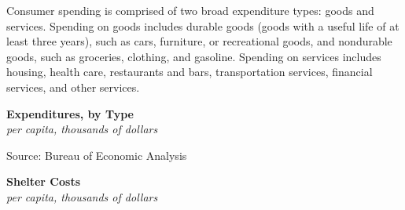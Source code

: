 \documentclass{report}
\makeatletter
\newcommand{\tbllink}[1]{\href{https://raw.githubusercontent.com/bdecon/US-chartbook/master/chartbook/data/#1}{\faTable}}
\newcommand*\short[1]{\expandafter\@gobbletwo\number\numexpr#1\relax}
\newcommand{\stdnode}[3]{\node[below, align=left, shift=({#1,#2})]{#3};}
\newcommand{\shdateaxisticks}{
		date coordinates in=x, axis line style={draw=none},
		xmax={2024-01-31},
		max space between ticks=40,	    
		xtick={{1990-01-01}, {1995-01-01}, {2000-01-01}, 
			{2005-01-01}, {2010-01-01}, {2015-01-01}, {2020-01-01}},
		minor xtick={},
		enlarge y limits={0.06}, enlarge x limits={0.01},
		xticklabel style={align=center, yshift=-2pt}, tick label style={inner sep=0pt},
		}
\newcommand{\bbar}[2]{extra #1 ticks = {{#2}}, extra #1 tick labels = ,
		extra #1 tick style = {grid=major, grid style={thick, black!25}},}
\newcommand{\stdline}[4]{\addplot[very thick, no markers, color=#1] 
		table [x=#2, y=#3, col sep=comma] {#4};	}
\newcommand{\rbars}{
		\fill[color=black!10] (axis cs:{1990-07-01},\pgfkeysvalueof{/pgfplots/ymin})
			rectangle (axis cs:{1991-03-01}, \pgfkeysvalueof{/pgfplots/ymax});
		\fill[color=black!10] (axis cs:{2007-12-01},\pgfkeysvalueof{/pgfplots/ymin})
			rectangle (axis cs:{2009-07-01}, \pgfkeysvalueof{/pgfplots/ymax});
		\fill[color=black!10] (axis cs:{2001-03-01},\pgfkeysvalueof{/pgfplots/ymin})
			rectangle (axis cs:{2001-11-01}, \pgfkeysvalueof{/pgfplots/ymax});
		\fill[color=black!10] (axis cs:{2020-02-01},\pgfkeysvalueof{/pgfplots/ymin})
			rectangle (axis cs:{2020-05-01}, \pgfkeysvalueof{/pgfplots/ymax});}
\makeatother
\begin{document}
{\begin{minipage}{1.0\textwidth}
Consumer spending is comprised of two broad expenditure types: goods and services. Spending on goods includes durable goods (goods with a useful life of at least three years), such as cars, furniture, or recreational goods, and nondurable goods, such as groceries, clothing, and gasoline. Spending on services includes housing, health care, restaurants and bars, transportation services, financial services, and other services. 
\end{minipage}

\begin{minipage}{0.38\textwidth}
\normalsize \textbf{Expenditures, by Type}\\
\footnotesize{\textit{per capita, thousands of dollars}}
\vspace{3.1cm}

\hspace{3mm} 

\footnotesize{Source: Bureau of Economic Analysis} \hspace{10mm} \tbllink{pce_levels.csv}
\end{minipage} \hspace{6mm}
\begin{minipage}{0.33\textwidth}
\small 
\end{minipage}
\vspace{1mm}

\begin{minipage}{0.38\textwidth}
\normalsize \textbf{Shelter Costs}\\
\footnotesize{\textit{per capita, thousands of dollars}}
\vspace{3.1cm}


\end{minipage}}
\end{document}
